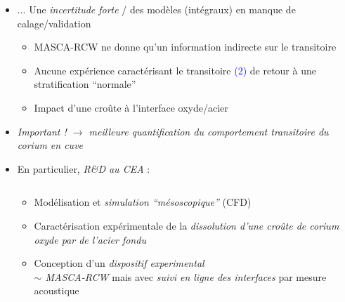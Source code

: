 \begin{frame}[fragile]
	\begin{itemize}
	\item ... Une \emph{incertitude forte} / des modèles (intégraux) en manque de calage/validation
	\begin{itemize}
	\item MASCA-RCW ne donne qu'un information indirecte sur le transitoire
	\item Aucune expérience caractérisant le transitoire \textcolor{blue}{(2)} de retour à une stratification ``normale'' 
	\item Impact d'une croûte à l'interface oxyde/acier
	\end{itemize}
	\item \emph{Important ! $\rightarrow$ meilleure quantification du comportement transitoire du corium en cuve}
	\item En particulier, \emph{R\&D au CEA} :
	\begin{columns}
	\begin{column}{0.55\textwidth}
	\begin{itemize}
	\item Modélisation et \emph{simulation ``mésoscopique''} (CFD) \cite{Zanella2020}
	\item Caractérisation expérimentale de la \emph{dissolution d'une croûte de corium oxyde par de l'acier fondu} \cite{Pivano2019}
	\item Conception d'un \emph{dispositif experimental \\ $\sim$ MASCA-RCW} mais avec \emph{suivi en ligne des interfaces} par mesure acoustique \cite{Cavaro2019}
	\end{itemize}
	\end{column}
	\begin{column}{0.1\textwidth}
	\begin{minipage}{\textwidth}

\end{minipage}
\end{column}
\end{columns}
\end{itemize}
\end{frame}
